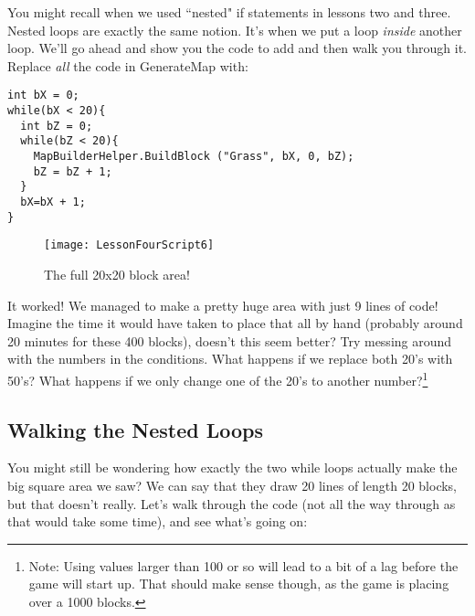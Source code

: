 \documentclass{article}
\begin{document}
You might recall when we used ``nested" if statements in lessons two and three. Nested loops are exactly the same notion. It's when we put a loop \textit{inside} another loop. We'll go ahead and show you the code to add and then walk you through it. Replace \textit{all} the code in GenerateMap with:

\lstset{style=sharpc}
\begin{lstlisting}
int bX = 0;
while(bX < 20){
  int bZ = 0;
  while(bZ < 20){
    MapBuilderHelper.BuildBlock ("Grass", bX, 0, bZ);
    bZ = bZ + 1;
  }
  bX=bX + 1;
}
\end{lstlisting} 
\begin{figure}
  \texttt{[image: LessonFourScript6]}
  \caption{The full 20x20 block area!}
  \label{fig:LessonFourScript6}
\end{figure}

\noindent{}

It worked! We managed to make a pretty huge area with just 9 lines of code! Imagine the time it would have taken to place that all by hand (probably around 20 minutes for these 400 blocks), doesn't this seem better? Try messing around with the numbers in the conditions. What happens if we replace both 20's with 50's? What happens if we only change one of the 20's to another number?\footnote{Note: Using values larger than 100 or so will lead to a bit of a lag before the game will start up. That should make sense though, as the game is placing over a 1000 blocks.}

\subsection{Walking the Nested Loops}

You might still be wondering how exactly the two while loops actually make the big square area we saw? We can say that they draw 20 lines of length 20 blocks, but that doesn't really. Let's walk through the code (not all the way through as that would take some time), and see what's going on: 
\end{document}
